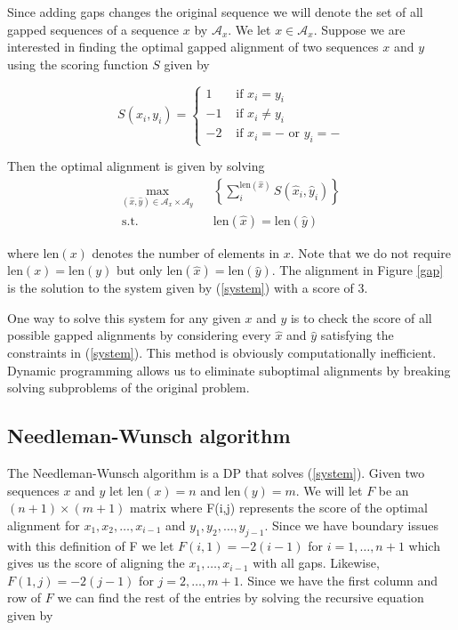 \documentclass{article}
\numberwithin{equation}{section}
\newcommand{\len}{\mathrm{len}}
\begin{document}
Since adding gaps changes the original sequence we will denote the
set of all gapped sequences of a sequence $x$ by $\mathcal{A}_x$. We
let $x\in\mathcal{A}_x$.  Suppose we are interested in finding the
optimal gapped alignment of two sequences $x$ and $y$ using the
scoring function $S$ given by

\[
S(x_i,y_i)=\left\{
\begin{array}{ll}
1 & \mbox{ if } x_i=y_i \\
-1 & \mbox{ if } x_i\neq y_i \\
-2 & \mbox{ if } x_i=- \mbox{ or } y_i=-
\end{array}
\right.
\]

Then the optimal alignment is given by solving
\begin{eqnarray}\label{system}
\max_{(\hat{x},\hat{y})\in\mathcal{A}_x\times\mathcal{A}_y} &&
\left\{\sum_i^{\len(\hat{x})}S(\hat{x}_i,\hat{y}_i)\right\}\nonumber
\\
\textrm{s.t.} &&  \len(\hat{x})=\len(\hat{y}) \nonumber
\end{eqnarray}

where $\len(x)$ denotes the number of elements in $x$.  Note that we
do not require $\len(x)=\len(y)$ but only
$\len(\hat{x})=\len(\hat{y})$.  The alignment in Figure \ref{gap} is
the solution to the system given by (\ref{system}) with a score of
3.

One way to solve this system for any given $x$ and $y$ is to check
the score of all possible gapped alignments by considering every
$\hat{x}$ and $\hat{y}$ satisfying the constraints in
(\ref{system}).  This method is obviously computationally
inefficient. Dynamic programming allows us to eliminate suboptimal
alignments by breaking solving subproblems of the original problem.

\subsection{Needleman-Wunsch algorithm}

The Needleman-Wunsch algorithm is a DP that solves (\ref{system}).
Given two sequences $x$ and $y$ let $\len(x)=n$ and $\len(y)=m$.  We
will let $F$ be an $(n+1)\times (m+1)$ matrix where F(i,j)
represents the score of the optimal alignment for
$x_1,x_2,\ldots,x_{i-1}$ and $y_1,y_2,\ldots,y_{j-1}$. Since we have
boundary issues with this definition of F we let $F(i,1)=-2(i-1)$
for $i=1,\ldots,n+1$ which gives us the score of aligning the
$x_1,\ldots,x_{i-1}$ with all gaps.  Likewise, $F(1,j)=-2(j-1)$ for
$j=2,\ldots,m+1$.  Since we have the first column and row of $F$ we
can find the rest of the entries by solving the recursive equation
given by
\end{document}
